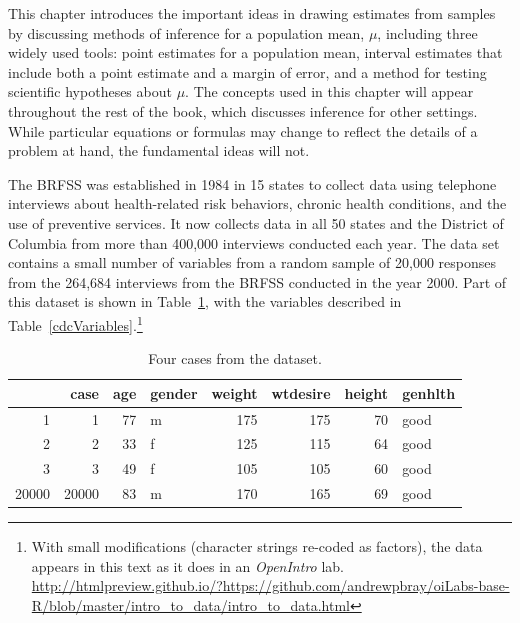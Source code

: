 This chapter introduces the important ideas in drawing estimates from samples by discussing methods of inference for a population mean, $\mu$, including three widely used tools: point estimates for a population mean, interval estimates that include both a point estimate and a margin of error, and a method for testing scientific hypotheses about $\mu$. The concepts used in this chapter will appear throughout the rest of the book, which discusses inference for other settings. While particular equations or formulas may change to reflect the details of a problem at hand, the fundamental ideas will not. 


The BRFSS was established in 1984 in 15 states to collect data using telephone interviews about health-related risk behaviors, chronic health conditions, and the use of preventive services.  It now collects data in all 50 states and the District of Columbia from more than 400,000 interviews conducted each year.  The data set  contains a small number of variables from a random sample of 20,000 responses from the 264,684 interviews from the BRFSS conducted in the year 2000.  Part of this dataset is shown in Table~\ref{cdcDF}, with the variables described in Table~\ref{cdcVariables}.\footnote{With small modifications (character strings re-coded as factors), the data appears in this text as it does in an \textit{OpenIntro} lab. \url{http://htmlpreview.github.io/?https://github.com/andrewpbray/oiLabs-base-R/blob/master/intro\_to\_data/intro\_to\_data.html} }


\begin{table}[ht]
\centering
\begin{tabular}{rrrlrrrl}
  \hline
 & case & age & gender & weight & wtdesire & height & genhlth \\ 
  \hline
1 &   1 &  77 & m & 175 & 175 &  70 & good \\ 
  2 &   2 &  33 & f & 125 & 115 &  64 & good \\ 
  3 &   3 &  49 & f & 105 & 105 &  60 & good \\ 
  20000 & 20000 &  83 & m & 170 & 165 &  69 & good \\ 
   \hline
\end{tabular}
\caption{Four cases from the  dataset.}
\label{cdcDF}
\end{table}


